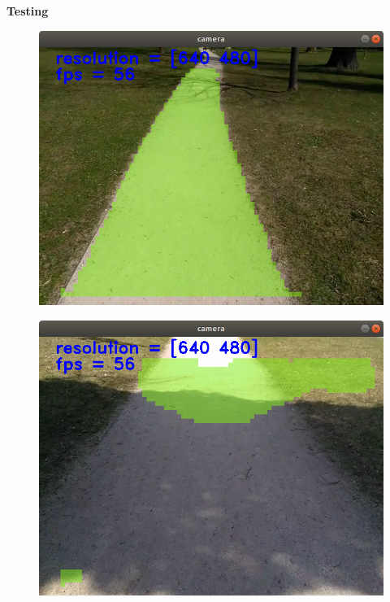 \documentclass[xcolor=dvipsnames]{beamer}
\begin{document}
\begin{frame}{\bf Testing}

\begin{figure}[!htb]
  \centering
  \includegraphics[scale=0.2]{../../pictures/image_processing/detector_test_0.png}
\end{figure}

\begin{figure}[!htb]
  \centering
  \includegraphics[scale=0.2]{../../pictures/image_processing/detector_test_1.png}
\end{figure}


\end{frame}
\end{document}
